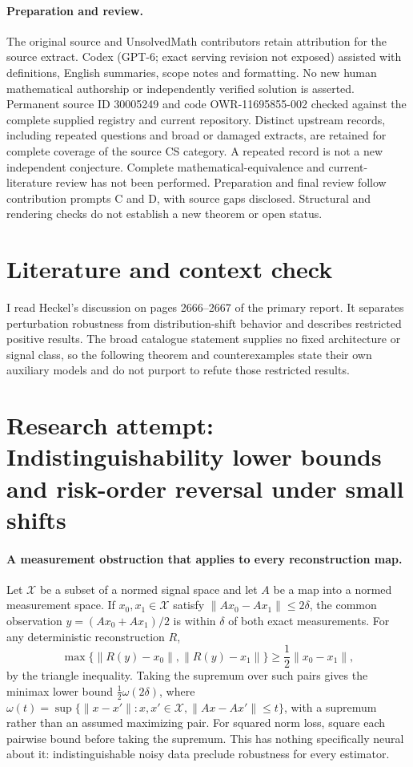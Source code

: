 \documentclass[11pt]{article}
\begin{document}
\paragraph{Preparation and review.}
The original source and UnsolvedMath contributors retain attribution for the source extract. Codex (GPT-6; exact serving revision not exposed) assisted with definitions, English summaries, scope notes and formatting. No new human mathematical authorship or independently verified solution is asserted. Permanent source ID 30005249 and code OWR-11695855-002 checked against the complete supplied registry and current repository. Distinct upstream records, including repeated questions and broad or damaged extracts, are retained for complete coverage of the source CS category. A repeated record is not a new independent conjecture. Complete mathematical-equivalence and current-literature review has not been performed. Preparation and final review follow contribution prompts C and D, with source gaps disclosed. Structural and rendering checks do not establish a new theorem or open status.
\label{end:30005249}

\section{Literature and context check}

I read Heckel's discussion on pages 2666--2667 of the primary report. It
separates perturbation robustness from distribution-shift behavior and describes
restricted positive results. The broad catalogue statement supplies no fixed
architecture or signal class, so the following theorem and counterexamples state
their own auxiliary models and do not purport to refute those restricted results.

\section{Research attempt: Indistinguishability lower bounds and risk-order reversal under small shifts}

\paragraph{A measurement obstruction that applies to every reconstruction map.}
Let $\mathcal X$ be a subset of a normed signal space and let $A$ be a map
into a normed measurement space. If $x_0,x_1\in\mathcal X$ satisfy
$\|Ax_0-Ax_1\|\leq2\delta$, the common observation
$y=(Ax_0+Ax_1)/2$ is within $\delta$ of both exact measurements.
For any deterministic reconstruction $R$,
\[
 \max\{\|R(y)-x_0\|,\|R(y)-x_1\|\}
 \geq\frac12\|x_0-x_1\|,
\]
by the triangle inequality. Taking the supremum over such pairs gives the
minimax lower bound $\frac12\omega(2\delta)$, where
$\omega(t)=\sup\{\|x-x'\|:x,x'\in\mathcal X,\|Ax-Ax'\|\leq t\}$,
with a supremum rather than an assumed maximizing pair.
For squared norm loss, square each pairwise bound before taking the supremum.
This has nothing specifically neural about it: indistinguishable noisy data
preclude robustness for every estimator.
\end{document}
